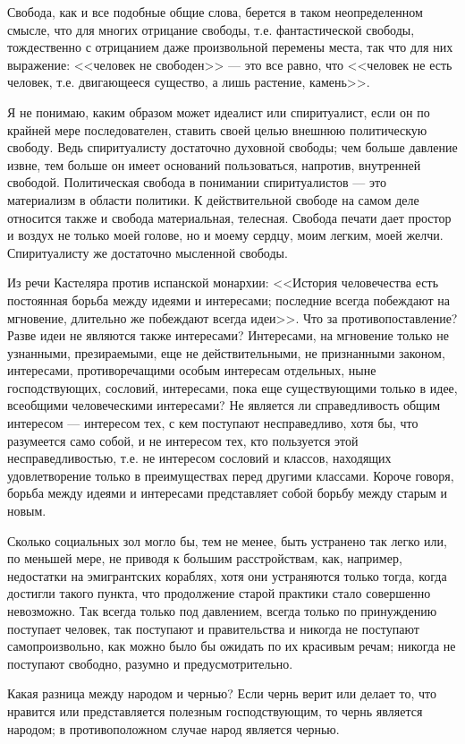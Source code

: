 \documentclass[12pt]{article}
\begin{document}
\bigskip

Свобода, как и все подобные общие слова, берется в таком неопределенном смысле, что для многих отрицание свободы, т.е. фантастической свободы, тождественно с отрицанием даже произвольной перемены места, так что для них выражение: <<человек не свободен>> --- это все равно, что <<человек не есть человек, т.е. двигающееся существо, а лишь растение, камень>>.

\bigskip

Я не понимаю, каким образом может идеалист или спиритуалист, если он по крайней мере последователен, ставить своей целью внешнюю политическую свободу. Ведь спиритуалисту достаточно духовной свободы; чем больше давление извне, тем больше он имеет оснований пользоваться, напротив, внутренней свободой. Политическая свобода в понимании спиритуалистов --- это материализм в области политики. К действительной свободе на самом деле относится также и свобода материальная, телесная. Свобода печати дает простор и воздух не только моей голове, но и моему сердцу, моим легким, моей желчи. Спиритуалисту же достаточно мысленной свободы.

\bigskip

Из речи Кастеляра против испанской монархии: <<История человечества есть постоянная борьба между идеями и интересами; последние всегда побеждают на мгновение, длительно же побеждают всегда идеи>>. Что за противопоставление? Разве идеи не являются также интересами? Интересами, на мгновение только не узнанными, презираемыми, еще не действительными, не признанными законом, интересами, противоречащими особым интересам отдельных, ныне господствующих, сословий, интересами, пока еще существующими только в идее, всеобщими человеческими интересами? Не является ли справедливость общим интересом --- интересом тех, с кем поступают несправедливо, хотя бы, что разумеется само собой, и не интересом тех, кто пользуется этой несправедливостью, т.е. не интересом сословий и классов, находящих удовлетворение только в преимуществах перед другими классами. Короче говоря, борьба между идеями и интересами представляет собой борьбу между старым и новым.

\bigskip

Сколько социальных зол могло бы, тем не менее, быть устранено так легко или, по меньшей мере, не приводя к большим расстройствам, как, например, недостатки на эмигрантских кораблях, хотя они устраняются только тогда, когда достигли такого пункта, что продолжение старой практики стало совершенно невозможно. Так всегда только под давлением, всегда только по принуждению поступает человек, так поступают и правительства и никогда не поступают самопроизвольно, как можно было бы ожидать по их красивым речам; никогда не поступают свободно, разумно и предусмотрительно.

\bigskip

Какая разница между народом и чернью? Если чернь верит или делает то, что нравится или представляется полезным господствующим, то чернь является народом; в противоположном случае народ является чернью.
\end{document}
